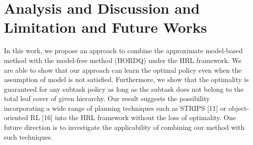 \chapter{Analysis and Discussion and Limitation and Future Works}

In this work, we propose an approach to combine the approximate model-based method with the
model-free method (HORDQ) under the HRL framework. We are able to show that our approach
can learn the optimal policy even when the assumption of model is not satisfied. Furthermore, we show that the optimality
is guaranteed for any subtask policy as long as the subtask does not belong to the total leaf
cover of given hierarchy. Our result suggests the possibility incorporating a wide range of planning
techniques such as STRIPS [11] or object-oriented RL [16] into the HRL framework without the
loss of optimality. One future direction is to investigate the applicability of combining our method
with such techniques.








